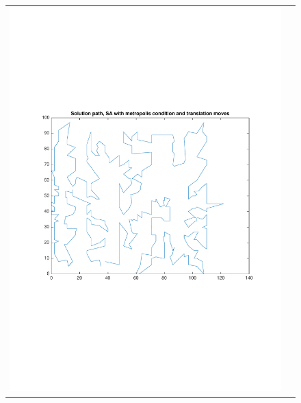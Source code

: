 \documentclass[a4paper, 11pt]{scrartcl}
\begin{document}
\begin{figure}[!ht]
\begin{tabular}{cc}
    \includegraphics[scale=0.4, trim={3cm 6cm 1cm 6cm}]{../figures/solutionPath_SA_metropolis_translation.pdf} \\ 

\end{tabular}
\end{figure}
\end{document}
